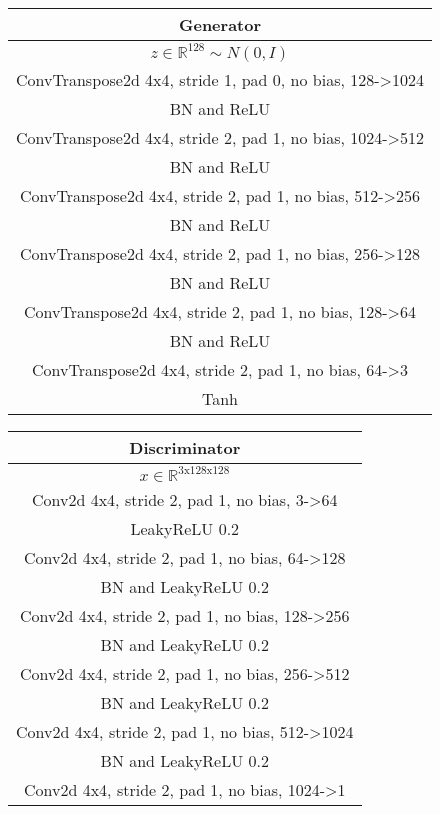 \documentclass{article}
\begin{document}
\begin{tabular}{c}
	Generator \\
	\toprule\midrule
	$z \in \mathbb{R}^{128} \sim N(0,I)$ \\
	\midrule
	ConvTranspose2d 4x4, stride 1, pad 0, no bias, 128->1024 \\
	\midrule
	BN and ReLU \\
	\midrule
	ConvTranspose2d 4x4, stride 2, pad 1, no bias, 1024->512 \\
	\midrule
	BN and ReLU \\
	\midrule
	ConvTranspose2d 4x4, stride 2, pad 1, no bias, 512->256 \\
	\midrule
	BN and ReLU \\
	\midrule
	ConvTranspose2d 4x4, stride 2, pad 1, no bias, 256->128 \\
	\midrule
	BN and ReLU \\
	\midrule
	ConvTranspose2d 4x4, stride 2, pad 1, no bias, 128->64 \\
	\midrule
	BN and ReLU \\
	\midrule
	ConvTranspose2d 4x4, stride 2, pad 1, no bias, 64->3 \\
	\midrule
	Tanh \\
	\bottomrule
\end{tabular} 
\quad
\begin{tabular}{c}
	Discriminator \\
	\toprule\midrule
	$x \in \mathbb{R}^{\text{3x128x128}}$ \\
	\midrule
	Conv2d 4x4, stride 2, pad 1, no bias, 3->64 \\
	\midrule
	LeakyReLU 0.2 \\
	\midrule
	Conv2d 4x4, stride 2, pad 1, no bias, 64->128 \\
	\midrule
	BN and LeakyReLU 0.2 \\
	\midrule
	Conv2d 4x4, stride 2, pad 1, no bias, 128->256 \\
	\midrule
	BN and LeakyReLU 0.2 \\
	\midrule
	Conv2d 4x4, stride 2, pad 1, no bias, 256->512 \\
	\midrule
	BN and LeakyReLU 0.2 \\
	\midrule
	Conv2d 4x4, stride 2, pad 1, no bias, 512->1024 \\
	\midrule
	BN and LeakyReLU 0.2 \\
	\midrule
	Conv2d 4x4, stride 2, pad 1, no bias, 1024->1 \\
	\bottomrule
\end{tabular}
\end{document}
